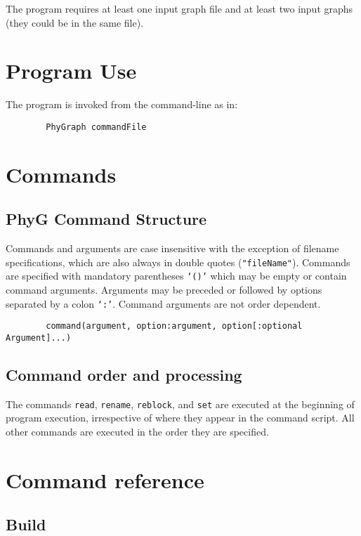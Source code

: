 \documentclass[11pt]{article}
\begin{document}
	The program requires at least one input graph file and at least two input graphs (they could be in the same file).

	
	\section{Program Use}
	The program is invoked from the command-line as in:
		\begin{verbatim}
		PhyGraph commandFile
		\end{verbatim}
	
	\section{Commands}
		\subsection{PhyG Command Structure}
		Commands and arguments are case insensitive with the exception of filename specifications, which are also 
		always in double quotes (\texttt{"fileName"}).  Commands are specified with mandatory parentheses \texttt{`()'} which may be empty or
		contain command arguments. Arguments may be preceded or followed by options separated by a colon \texttt{`:'}.  Command arguments are not order dependent.
		
		\begin{verbatim}
		command(argument, option:argument, option[:optional Argument]...)
		\end{verbatim}
		\subsection{Command order and processing}
			The commands \texttt{read}, \texttt{rename}, \texttt{reblock}, and \texttt{set} are executed at
			 the beginning of program execution, irrespective of where they appear in the command script.  All other
			  commands are executed in the order they are specified.

	\section{Command reference}
%	
	
	\subsection{Build}
\end{document}
